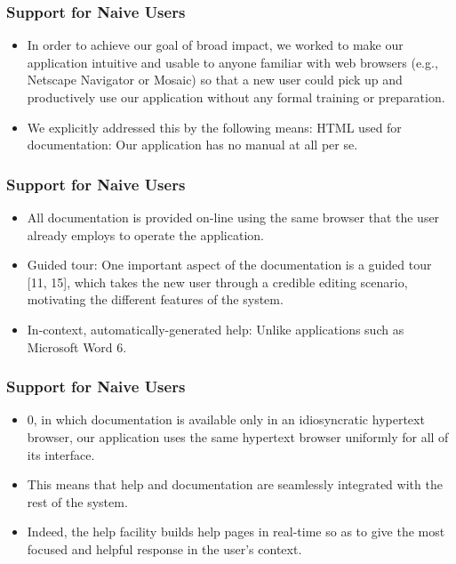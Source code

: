 \documentclass{beamer}
\begin{document}
\begin{frame}
\frametitle{Support for Naive Users}

\begin{itemize}
\item In order to achieve our goal of broad impact, we worked to make our application intuitive and usable to anyone familiar with web browsers (e.g., Netscape Navigator or Mosaic) so that a new user could pick up and productively use our application without any formal training or preparation.
\item We explicitly addressed this by the following means: HTML used for documentation: Our application has no manual at all per se.
\end{itemize}

\end{frame}

\begin{frame}
\frametitle{Support for Naive Users}

\begin{itemize}
\item All documentation is provided on-line using the same browser that the user already employs to operate the application.
\item Guided tour: One important aspect of the documentation is a guided tour [11, 15], which takes the new user through a credible editing scenario, motivating the different features of the system.
\item In-context, automatically-generated help: Unlike applications such as Microsoft Word 6.
\end{itemize}

\end{frame}

\begin{frame}
\frametitle{Support for Naive Users}

\begin{itemize}
\item 0, in which documentation is available only in an idiosyncratic hypertext browser, our application uses the same hypertext browser uniformly for all of its interface.
\item This means that help and documentation are seamlessly integrated with the rest of the system.
\item Indeed, the help facility builds help pages in real-time so as to give the most focused and helpful response in the user's context.
\end{itemize}

\end{frame}
\end{document}
